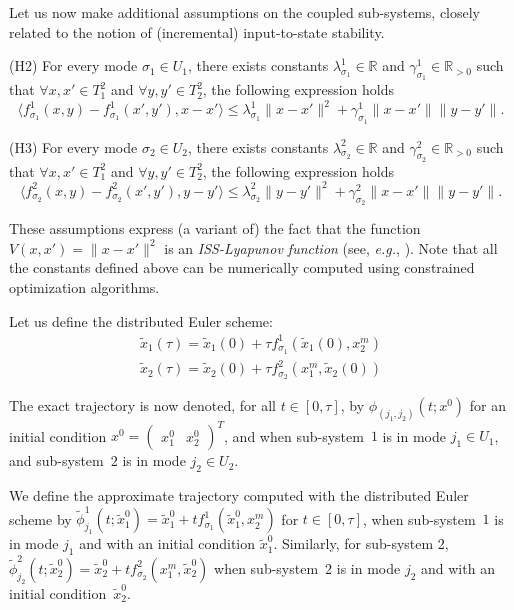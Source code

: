 Let us now make additional assumptions on the coupled sub-systems,
closely related to the notion of (incremental) input-to-state
stability.

(H2) For every mode $\sigma_1 \in U_1$, there exists constants
$\lambda^1_{\sigma_1} \in \mathbb{R}$ and $\gamma^1_{\sigma_1} \in
\mathbb{R}_{>0}$ such that $\forall x,x' \in T_1^2$ and $\forall y,y'
\in T_2^2 $, the following expression holds
$$ \langle f_{\sigma_1}^1 (x,y) - f_{\sigma_1}^1 (x',y'), x - x' \rangle \leq \lambda^1_{\sigma_1} \| x - x' \|^2 + \gamma^1_{\sigma_1} \| x - x' \| \| y - y' \|. $$


(H3) For every mode $\sigma_2 \in U_2$, there exists constants
$\lambda^2_{\sigma_2} \in \mathbb{R}$ and $\gamma^2_{\sigma_2} \in
\mathbb{R}_{>0}$ such that $\forall x,x' \in T_1^2$ and $\forall y,y'
\in T_2^2 $, the following expression holds $$ \langle f_{\sigma_2}^2
(x,y) - f_{\sigma_2}^2 (x',y'), y - y' \rangle \leq
\lambda^2_{\sigma_2} \| y - y' \|^2 + \gamma^2_{\sigma_2} \| x - x' \|
\| y - y' \|. $$
%

These assumptions express (a variant of) the fact that the function
$V(x,x')=\|x-x'\|^2$ is an {\em ISS-Lyapunov function} (see,
\textit{e.g.}, \cite{angeli2000lyapunov,hespanha2008lyapunov}).  Note
that all the constants defined above can be numerically computed using
constrained optimization algorithms.

Let us define the distributed Euler scheme:
\begin{eqnarray}
 \tilde x_1(\tau) = \tilde x_1(0) + \tau f_{\sigma_1}^1(\tilde x_1(0),x_2^m)
 \\
 \tilde x_2(\tau) = \tilde x_2(0) + \tau f_{\sigma_2}^2 ( x_1^m,\tilde x_2(0))
\end{eqnarray}

The exact trajectory is now denoted, for all $t \in [0,\tau]$, by
$\phi_{(j_1,j_2)}(t;x^0)$ for an initial condition $x^0
= \begin{pmatrix}x_1^0 & x_2^0\end{pmatrix}^T$, and when
sub-system~$1$ is in mode $j_1 \in U_1$, and sub-system~$2$ is in mode
$j_2 \in U_2$.

We define the approximate trajectory computed with the distributed
Euler scheme by $\tilde{\phi}_{j_ 1}^1(t;\tilde{x}_1^0) = \tilde x_1^0
+ t f_{\sigma_1}^1(\tilde x_1^0,x_2^m)$ for $t \in [0,\tau]$, when
sub-system~$1$ is in mode $j_1$ and with an initial condition $\tilde
x_1^0$. Similarly, for sub-system 2, $\tilde{\phi}_{j_
  2}^2(t;\tilde{x}_2^0) = \tilde x_2^0 + t f_{\sigma_2}^2(x_1^m,\tilde
x_2^0)$ when sub-system~$2$ is in mode $j_2$ and with an initial
condition~$\tilde x_2^0$.

